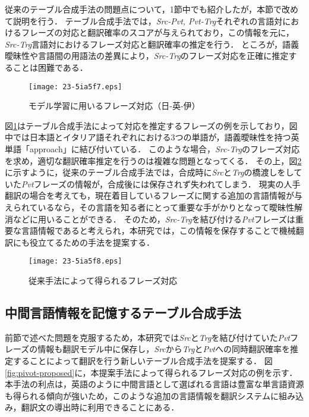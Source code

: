 \documentclass[japanese]{jnlp_1.4}
\begin{document}
従来のテーブル合成手法の問題点について，1節中でも紹介したが，本節で改めて説明を行う．
テーブル合成手法では，\textit{Src-Pvt, Pvt-Trg}それぞれの言語対におけるフレーズの対応と翻訳確率のスコアが与えられており，この情報を元に，\textit{Src-Trg}言語対におけるフレーズ対応と翻訳確率の推定を行う．
ところが，語義曖昧性や言語間の用語法の差異により，\textit{Src-Trg}のフレーズ対応を正確に推定することは困難である．

\begin{figure}[b]
\begin{center}
\texttt{[image: 23-5ia5f7.eps]}
\end{center}
\caption{モデル学習に用いるフレーズ対応（日-英-伊）}
\label{fig:pivot-align}
\end{figure}

図\ref{fig:pivot-align}はテーブル合成手法によって対応を推定するフレーズの例を示しており，図中では日本語とイタリア語それぞれにおける3つの単語が，語義曖昧性を持つ英単語「approach」に結び付いている．
このような場合，\textit{Src-Trg}のフレーズ対応を求め，適切な翻訳確率推定を行うのは複雑な問題となってくる．
その上，図\ref{fig:pivot-traditional}に示すように，従来のテーブル合成手法では，合成時に\textit{Src}と\textit{Trg}の橋渡しをしていた\textit{Pvt}フレーズの情報が，合成後には保存されず失われてしまう．
現実の人手翻訳の場合を考えても，現在着目しているフレーズに関する追加の言語情報が与えられているなら，その言語を知る者にとって重要な手がかりとなって曖昧性解消などに用いることができる．
そのため，\textit{Src-Trg}を結び付ける\textit{Pvt}フレーズは重要な言語情報であると考えられ，本研究では，この情報を保存することで機械翻訳にも役立てるための手法を提案する．

\begin{figure}[b]
\begin{center}
\texttt{[image: 23-5ia5f8.eps]}
\end{center}
\caption{従来手法によって得られるフレーズ対応}
\label{fig:pivot-traditional}
\vspace{0.5\Cvs}
\end{figure}


\subsection{中間言語情報を記憶するテーブル合成手法}

前節で述べた問題を克服するため，本研究では\textit{Src}と\textit{Trg}を結び付けていた\textit{Pvt}フレーズの情報も翻訳モデル中に保存し，\textit{Src}から\textit{Trg}と\textit{Pvt}への同時翻訳確率を推定することによって翻訳を行う新しいテーブル合成手法を提案する．
図\ref{fig:pivot-proposed}に，本提案手法によって得られるフレーズ対応の例を示す．
本手法の利点は，英語のように中間言語として選ばれる言語は豊富な単言語資源も得られる傾向が強いため，このような追加の言語情報を翻訳システムに組み込み，翻訳文の導出時に利用できることにある．
\end{document}
